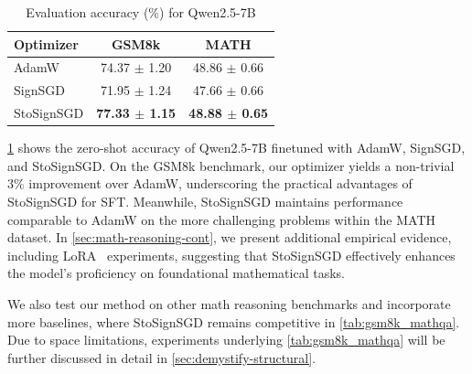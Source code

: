\documentclass{article}
\begin{document}
\begin{table}
\vspace{-10pt} 
\caption{Evaluation accuracy (\%) for Qwen2.5-7B\label{tab:numinamath-results}}
\vspace{-5pt} 
\centering
\begin{tabular}{lcc}
\toprule
\textbf{Optimizer} & \textbf{GSM8k} & \textbf{MATH} \\
\midrule
AdamW   & 74.37 \(\pm\) 1.20 & 48.86 \(\pm\) 0.66  \\
SignSGD &  71.95 \(\pm\) 1.24&  47.66 \(\pm\) 0.66   \\
\rowcolor{yellow!20}StoSignSGD & \textbf{77.33 \(\pm\) 1.15} & \textbf{48.88 \(\pm\) 0.65}  \\
\bottomrule
\end{tabular}
\vspace{-8pt} 
\end{table}

\cref{tab:numinamath-results} shows the zero-shot accuracy of Qwen2.5-7B finetuned with AdamW, SignSGD, and StoSignSGD. On the GSM8k benchmark, our optimizer yields a non-trivial $3\%$ improvement over AdamW, underscoring the practical advantages of StoSignSGD for SFT. Meanwhile, StoSignSGD maintains performance comparable to AdamW on the more challenging problems within the MATH dataset. In \cref{sec:math-reasoning-cont}, we present additional empirical evidence, including LoRA~\citep{hu2022lora} experiments, suggesting that StoSignSGD effectively enhances the model's proficiency on foundational mathematical tasks.

We also test our method on other math reasoning benchmarks and incorporate more baselines, where StoSignSGD remains competitive in \cref{tab:gsm8k_mathqa}. Due to space limitations, experiments underlying \cref{tab:gsm8k_mathqa} will be further discussed in detail in \cref{sec:demystify-structural}.
\end{document}

